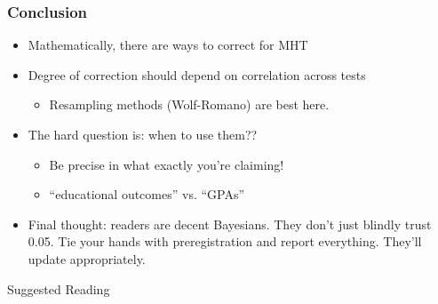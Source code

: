 \begin{frame}
\frametitle{Conclusion}
\begin{itemize}
    \item Mathematically, there are ways to correct for MHT
    \item Degree of correction should depend on correlation across tests
    \begin{itemize}
        \item Resampling methods (Wolf-Romano) are best here.
    \end{itemize}
    \item The hard question is: when to use them??
    \begin{itemize}
        \item Be precise in what exactly you're claiming!
        \item ``educational outcomes'' vs. ``GPAs''
    \end{itemize}
    \item Final thought: readers are decent Bayesians. They don't just blindly trust 0.05. Tie your hands with preregistration and report everything. They'll update appropriately.
\end{itemize}
\end{frame}



\nocite{}

\begin{frame}[allowframebreaks]{Suggested Reading}
    
\end{frame}


